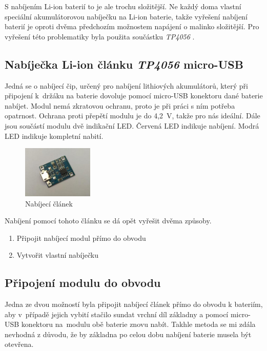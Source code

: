 S nabíjením Li-ion baterií to je ale trochu složitější. Ne každý doma vlastní speciální akumulátorovou nabíječku na Li-ion baterie, takže vyřešení nabíjení baterií je oproti dvěma předchozím možnostem napájení o malinko složitější. 
Pro vyřešení této problematiky byla použita součástku \textit{TP4056} \cite{TP4056}.


\subsection*{Nabíječka Li-ion článku \textit{TP4056} micro-USB}
Jedná se o nabíjecí čip, určený pro nabíjení lithiových akumulátorů, který při připojení k~držáku na baterie dovoluje pomocí micro-USB konektoru dané baterie nabíjet. Modul nemá zkratovou ochranu, proto je při práci s ním potřeba opatrnost. Ochrana proti přepětí modulu je do 4,2~V, takže pro nás ideální. Dále jsou součástí modulu dvě indikační LED. Červená LED indikuje nabíjení. Modrá LED indikuje kompletní nabití. 

\begin{figure}[htbp]
	\centering
	\includegraphics[width=0.3\textwidth]{img/02ele/Napajeciclanek.jpg}
	\caption{Nabíjecí článek}
\end{figure}

Nabíjení pomocí tohoto článku se dá opět vyřešit dvěma způsoby.

\begin{enumerate}
	\item Připojit nabíjecí modul přímo do obvodu
	\item Vytvořit vlastní nabíječku
\end{enumerate}


\subsection*{Připojení modulu do obvodu}
Jedna ze dvou možností byla připojit nabíjecí článek přímo do obvodu k bateriím, aby v~případě jejich vybití stačilo sundat vrchní díl základny a pomocí micro-USB konektoru na~modulu obě baterie znovu nabít.
Takhle metoda se mi zdála nevhodná z důvodu, že by základna po celou dobu nabíjení baterie musela být otevřena. 


